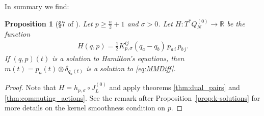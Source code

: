 \documentclass[12pt]{amsart}
\newcommand{\R}{\ensuremath{\mathbb{R}}}
\newtheorem{prop}[thm]{Proposition}
\begin{document}
  In summary we find:
  \begin{prop}[\S7 of \cite{MumfordMichor2013}] \label{prop:0-solutions}
  Let $p \geq \frac{n}{2} +1$ and $\sigma > 0$.
  Let $H:T^*Q_N^{(0)} \to \R$ be the function
  \begin{align*}
    H(q,p) =\frac{1}{2} K_{p,\sigma}^{ij}(q_a - q_b)\, p_{a\,i}\, p_{b\,j}.
  \end{align*}
  If $(q,p)(t)$ is a solution to Hamilton's equations, then
  $m(t) = p_a(t) \otimes \delta_{q_a(t)}$
  is a solution to \eqref{eq:MMDiff}.
\end{prop}
\begin{proof}
	Note that $H = h_{p,\sigma} \circ J_L^{(0)}$ and apply theorems \ref{thm:dual_pairs} and  \ref{thm:commuting_actions}.
  See the remark after Proposition~\ref{prop:k-solutions} for more details on the kernel smoothness condition on $p$.
\end{proof}
\end{document}
